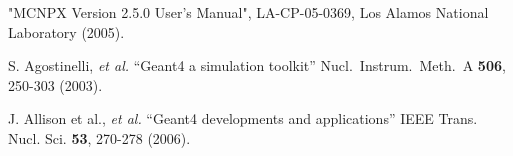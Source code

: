  "MCNPX Version 2.5.0 User's Manual", LA-CP-05-0369, Los Alamos National Laboratory (2005).

S. Agostinelli, {\it et al.}
``Geant4 a simulation toolkit''
Nucl.\ Instrum.\ Meth.\ A {\bf 506}, 250-303 (2003).

J. Allison et al., {\it et al.}
``Geant4 developments and applications''
IEEE Trans. Nucl. Sci. {\bf 53}, 270-278 (2006). 